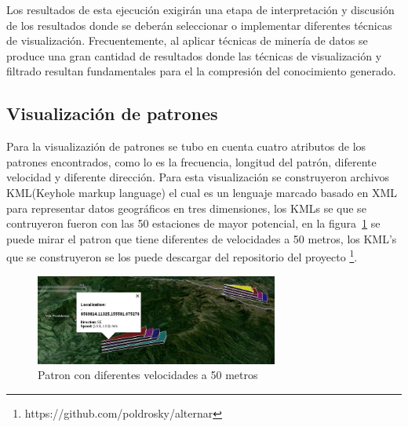 Los resultados de esta ejecución exigirán una etapa de interpretación y discusión
 de los resultados donde se deberán seleccionar o implementar diferentes
técnicas de visualización. Frecuentemente, al aplicar técnicas de minería de datos
se produce una gran cantidad de resultados donde las técnicas de visualización y
filtrado resultan fundamentales para el la compresión del conocimiento generado.

\subsection{Visualización de patrones}

Para la visualizazión de patrones se tubo en cuenta cuatro atributos de los patrones encontrados, como lo es
la frecuencia, longitud del patrón, diferente velocidad y diferente dirección. Para esta visualización se
construyeron archivos KML(Keyhole markup language) el cual es un lenguaje marcado basado en XML para representar
datos geográficos en tres dimensiones, los KMLs se que se contruyeron fueron con las 50 estaciones de mayor potencial,
en la figura~\ref{fig:speedpattern} se puede mirar el patron que tiene diferentes de velocidades a 50 metros, 
los KML's que se construyeron se los puede descargar del repositorio del
proyecto \footnote{https://github.com/poldrosky/alternar}.

\begin{figure}
  \centering
  \includegraphics[width = 8cm]{speedpattern.png}
  \caption{Patron con diferentes velocidades a 50 metros}
  \label{fig:speedpattern}
\end{figure}





